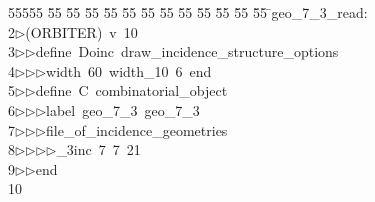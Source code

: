 %
%
\begin{tabbing}
55555 \= 55 \= 55 \= 55 \= 55 \= 55 \= 55 \= 55 \= 55 \= 55 \= 55 \= 55 \= 55 \= \>geo\_7\_3\_read:\\[0pt]
2\>$\triangleright$\>(ORBITER)\ v\ 10\ \\[0pt]
3\>$\triangleright$\>$\triangleright$\>define\ Doinc\ draw\_incidence\_structure\_options\ \\[0pt]
4\>$\triangleright$\>$\triangleright$\>$\triangleright$\>width\ 60\ width\_10\ 6\ end\ \\[0pt]
5\>$\triangleright$\>$\triangleright$\>define\ C\ combinatorial\_object\ \\[0pt]
6\>$\triangleright$\>$\triangleright$\>$\triangleright$\>label\ geo\_7\_3\ geo\_7\_3\ \\[0pt]
7\>$\triangleright$\>$\triangleright$\>$\triangleright$\>file\_of\_incidence\_geometries\ \\[0pt]
8\>$\triangleright$\>$\triangleright$\>$\triangleright$\>$\triangleright$\_3inc\ 7\ 7\ 21\ \\[0pt]
9\>$\triangleright$\>$\triangleright$\>end\\[0pt]
10\>\end{tabbing}
